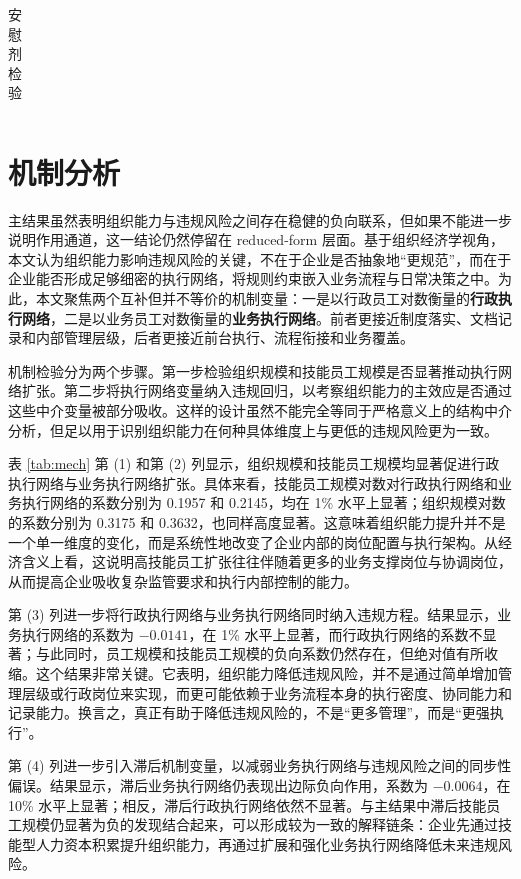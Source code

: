 \documentclass[12pt]{ctexart}
\begin{document}
\begin{table}[H]
\centering
\caption{安慰剂检验}
\label{tab:placebo}
\def\sym#1{\ifmmode^{#1}\else\(^{#1}\)\fi}
\begin{tabular}{l*{2}{c}}
\toprule
\\
\bottomrule
\end{tabular}
\end{table}

\section{机制分析}
主结果虽然表明组织能力与违规风险之间存在稳健的负向联系，但如果不能进一步说明作用通道，这一结论仍然停留在 reduced-form 层面。基于组织经济学视角，本文认为组织能力影响违规风险的关键，不在于企业是否抽象地“更规范”，而在于企业能否形成足够细密的执行网络，将规则约束嵌入业务流程与日常决策之中。为此，本文聚焦两个互补但并不等价的机制变量：一是以行政员工对数衡量的\textbf{行政执行网络}，二是以业务员工对数衡量的\textbf{业务执行网络}。前者更接近制度落实、文档记录和内部管理层级，后者更接近前台执行、流程衔接和业务覆盖。

机制检验分为两个步骤。第一步检验组织规模和技能员工规模是否显著推动执行网络扩张。第二步将执行网络变量纳入违规回归，以考察组织能力的主效应是否通过这些中介变量被部分吸收。这样的设计虽然不能完全等同于严格意义上的结构中介分析，但足以用于识别组织能力在何种具体维度上与更低的违规风险更为一致。

表 \ref{tab:mech} 第 (1) 和第 (2) 列显示，组织规模和技能员工规模均显著促进行政执行网络与业务执行网络扩张。具体来看，技能员工规模对数对行政执行网络和业务执行网络的系数分别为 0.1957 和 0.2145，均在 1\% 水平上显著；组织规模对数的系数分别为 0.3175 和 0.3632，也同样高度显著。这意味着组织能力提升并不是一个单一维度的变化，而是系统性地改变了企业内部的岗位配置与执行架构。从经济含义上看，这说明高技能员工扩张往往伴随着更多的业务支撑岗位与协调岗位，从而提高企业吸收复杂监管要求和执行内部控制的能力。

第 (3) 列进一步将行政执行网络与业务执行网络同时纳入违规方程。结果显示，业务执行网络的系数为 $-0.0141$，在 1\% 水平上显著，而行政执行网络的系数不显著；与此同时，员工规模和技能员工规模的负向系数仍然存在，但绝对值有所收缩。这个结果非常关键。它表明，组织能力降低违规风险，并不是通过简单增加管理层级或行政岗位来实现，而更可能依赖于业务流程本身的执行密度、协同能力和记录能力。换言之，真正有助于降低违规风险的，不是“更多管理”，而是“更强执行”。

第 (4) 列进一步引入滞后机制变量，以减弱业务执行网络与违规风险之间的同步性偏误。结果显示，滞后业务执行网络仍表现出边际负向作用，系数为 $-0.0064$，在 10\% 水平上显著；相反，滞后行政执行网络依然不显著。与主结果中滞后技能员工规模仍显著为负的发现结合起来，可以形成较为一致的解释链条：企业先通过技能型人力资本积累提升组织能力，再通过扩展和强化业务执行网络降低未来违规风险。
\end{document}
